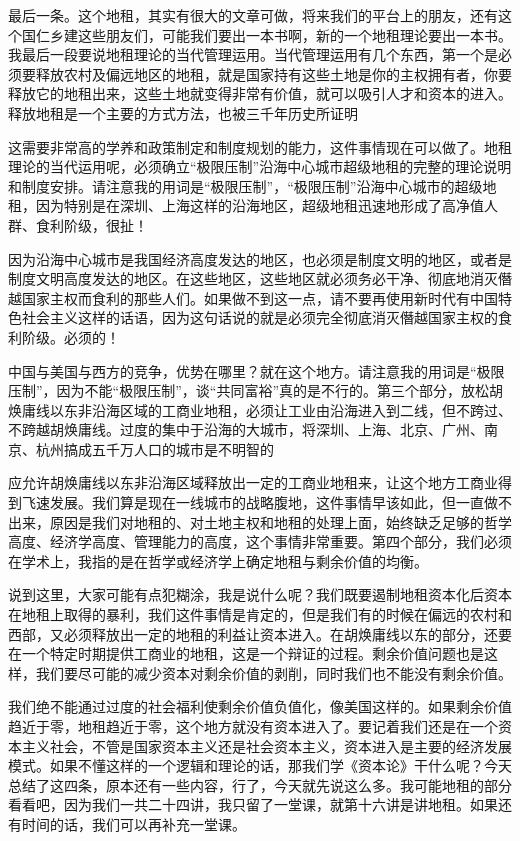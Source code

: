 \documentclass[UTF8, 12pt, a4paper]{ctexrep}
\begin{document}
最后一条。这个地租，其实有很大的文章可做，将来我们的平台上的朋友，还有这个国仁乡建这些朋友们，可能我们要出一本书啊，新的一个地租理论要出一本书。我最后一段要说地租理论的当代管理运用。当代管理运用有几个东西，第一个是必须要释放农村及偏远地区的地租，就是国家持有这些土地是你的主权拥有者，你要释放它的地租出来，这些土地就变得非常有价值，就可以吸引人才和资本的进入。释放地租是一个主要的方式方法，也被三千年历史所证明

这需要非常高的学养和政策制定和制度规划的能力，这件事情现在可以做了。地租理论的当代运用呢，必须确立“极限压制”沿海中心城市超级地租的完整的理论说明和制度安排。请注意我的用词是“极限压制”，“极限压制”沿海中心城市的超级地租，因为特别是在深圳、上海这样的沿海地区，超级地租迅速地形成了高净值人群、食利阶级，很扯！

因为沿海中心城市是我国经济高度发达的地区，也必须是制度文明的地区，或者是制度文明高度发达的地区。在这些地区，这些地区就必须务必干净、彻底地消灭僭越国家主权而食利的那些人们。如果做不到这一点，请不要再使用新时代有中国特色社会主义这样的话语，因为这句话说的就是必须完全彻底消灭僭越国家主权的食利阶级。必须的！

中国与美国与西方的竞争，优势在哪里？就在这个地方。请注意我的用词是“极限压制”，因为不能“极限压制”，谈“共同富裕”真的是不行的。第三个部分，放松胡焕庸线以东非沿海区域的工商业地租，必须让工业由沿海进入到二线，但不跨过、不跨越胡焕庸线。过度的集中于沿海的大城市，将深圳、上海、北京、广州、南京、杭州搞成五千万人口的城市是不明智的

应允许胡焕庸线以东非沿海区域释放出一定的工商业地租来，让这个地方工商业得到飞速发展。我们算是现在一线城市的战略腹地，这件事情早该如此，但一直做不出来，原因是我们对地租的、对土地主权和地租的处理上面，始终缺乏足够的哲学高度、经济学高度、管理能力的高度，这个事情非常重要。第四个部分，我们必须在学术上，我指的是在哲学或经济学上确定地租与剩余价值的均衡。

说到这里，大家可能有点犯糊涂，我是说什么呢？我们既要遏制地租资本化后资本在地租上取得的暴利，我们这件事情是肯定的，但是我们有的时候在偏远的农村和西部，又必须释放出一定的地租的利益让资本进入。在胡焕庸线以东的部分，还要在一个特定时期提供工商业的地租，这是一个辩证的过程。剩余价值问题也是这样，我们要尽可能的减少资本对剩余价值的剥削，同时我们也不能没有剩余价值。

我们绝不能通过过度的社会福利使剩余价值负值化，像美国这样的。如果剩余价值趋近于零，地租趋近于零，这个地方就没有资本进入了。要记着我们还是在一个资本主义社会，不管是国家资本主义还是社会资本主义，资本进入是主要的经济发展模式。如果不懂这样的一个逻辑和理论的话，那我们学《资本论》干什么呢？今天总结了这四条，原本还有一些内容，行了，今天就先说这么多。我可能地租的部分看看吧，因为我们一共二十四讲，我只留了一堂课，就第十六讲是讲地租。如果还有时间的话，我们可以再补充一堂课。
\end{document}
